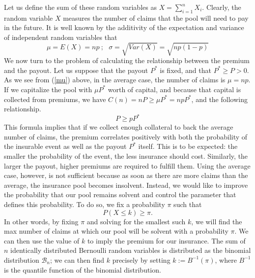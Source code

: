 \documentclass[12pt]{article}
\begin{document}
Let us define the sum of these random variables as $X = \sum_{i=1}^n X_i$. Clearly, the random variable $X$ measures the number of claims that the pool will need to pay in the future. It is well known by the additivity of the expectation and variance of independent random variables that
\begin{equation}
  \label{mu}
  \mu = E(X) = np\ ;\ \ \ \sigma = \sqrt{Var(X)} = \sqrt{np(1-p)}
\end{equation}
We now turn to the problem of calculating the relationship between the premium and the payout. Let us suppose that the payout $P^*$ is fixed, and that $P^*\geq P>0$. As we see from (\ref{mu}) above, in the average case, the number of claims is $\mu = np$. If we capitalize the pool with $\mu P^*$ worth of capital, and because that capital is collected from premiums, we have $C(n) = nP \geq \mu P^* = npP^*$, and the following relationship.
\begin{equation}
\label{avgpremium}
P \geq pP^*
\end{equation}
This formula implies that if we collect enough collateral to back the average number of claims, the premium correlates positively with both the probability of the insurable event as well as the payout $P^*$ itself. This is to be expected: the smaller the probability of the event, the less insurance should cost. Similarly, the larger the payout, higher premiums are required to fulfill them. Using the average case, however, is not sufficient because as soon as there are more claims than the average, the insurance pool becomes insolvent. Instead, we would like to improve the probability that our pool remains solvent and control the parameter that defines this probability. To do so, we fix a probability $\pi$ such that
\begin{equation*}
  P(X \leq k)\geq \pi.
\end{equation*}
In other words, by fixing $\pi$ and solving for the smallest such $k$, we will find the max number of claims at which our pool will be solvent with a probability $\pi$. We can then use the value of $k$ to imply the premium for our insurance. The sum of $n$ identically distributed Bernoulli random variables is distributed as the binomial distribution $\mathcal{B}_n$; we can then find $k$ precisely by setting $k:=B^{-1}(\pi)$, where $B^{-1}$ is the quantile function of the binomial distribution.
\end{document}

